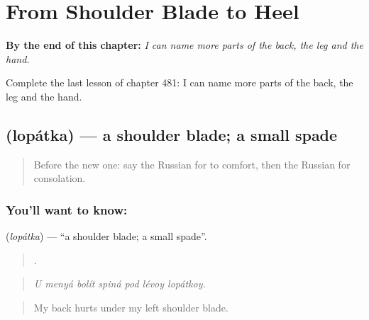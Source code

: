 
\chapter{From Shoulder Blade to Heel}
\label{ch:ru-from-shoulder-blade-to-heel}

\begin{chapteropening}
\textbf{By the end of this chapter:} \emph{I can name more parts of the back, the leg and the hand.}

Complete the last lesson of chapter 481: I can name more parts of the back, the leg and the hand.
\end{chapteropening}

\section[\texorpdfstring{\ru{лопатка} (lopátka)}{лопатка (lopátka)}]{ (lopátka) — a shoulder blade; a small spade}

\label{lesson:RU-C481-lopatka}



\begin{quote}
Before the new one: say the Russian for to comfort, then the Russian for consolation.
\end{quote}

\subsection*{You'll want to know: }
\textbf{} (\emph{lopátka}) — \textquotedblleft{}a shoulder blade; a small spade\textquotedblright{}.

\begin{quote}
      .
\end{quote}

\begin{quote}
\emph{U menyá bolít spiná pod lévoy lopátkoy.}
\end{quote}

\begin{quote}
My back hurts under my left shoulder blade.
\end{quote}

